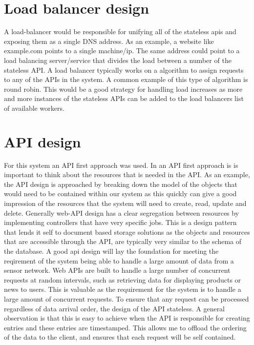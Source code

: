 \documentclass[]{uiophd}
\begin{document}
\section{Load balancer design}
A load-balancer would be responsible for unifying all of the stateless apis and exposing them as a single DNS address. As an example, a website like example.com points to a single machine/ip. The same address could point to a load balancing server/service that divides the load between a number of the stateless API. A load balancer typically works on a algorithm to assign requests to any of the APIs in the system. A common example of this type of algorithm is round robin. This would be a good strategy for handling load increases as more and more instances of the stateless APIs can be added to the load balancers list of available workers.

\section{API design}
For this system an API first approach was used. In an API first approach is is important to think about the resources that is needed in the API. As an example, the API design is approached by breaking down the model of the objects that would need to be contained within our system as this quickly can give a good impression of the resources that the system will need to create, read, update and delete. Generally web-API design has a clear segregation between resources by implementing controllers that have very specific jobs. This is a design pattern that lends it self to document based storage solutions as the objects and resources that are accessible through the API, are typically very similar to the schema of the database. A good api design will lay  the foundation for meeting the reqirement of the system being able to handle a large amount of data from a sensor network. Web APIs are built to handle a large number of concurrent requests at random intervals, such as retrieving data for displaying products or news to users. This is valuable as the requirement for the system is to handle a large amount of concurrent requests. To ensure that any request can be processed regardless of data arrival order, the design of the API stateless. A general observation is that this is easy to achieve when the API is responsible for creating entries and these entries are timestamped. This allows me to offload the ordering of the data to the client, and ensures that each request will be self contained.
\end{document}
